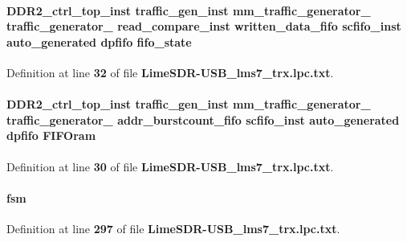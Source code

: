 \paragraph[{fifo\+\_\+state}]{ {\bf D\+D\+R2\+\_\+ctrl\+\_\+top\+\_\+inst} {\bf traffic\+\_\+gen\+\_\+inst} {\bf mm\+\_\+traffic\+\_\+generator\+\_} {\bf traffic\+\_\+generator\+\_} {\bf read\+\_\+compare\+\_\+inst} {\bf written\+\_\+data\+\_\+fifo} scfifo\+\_\+inst {\bf auto\+\_\+generated} {\bf dpfifo} fifo\+\_\+state}\label{LimeSDR-USB__lms7__trx_8lpc_8txt_a89cac4e93d8726ab378ee7a18be4097e}


Definition at line {\bf 32} of file {\bf Lime\+S\+D\+R-\/\+U\+S\+B\+\_\+lms7\+\_\+trx.\+lpc.\+txt}.

\paragraph[{F\+I\+F\+Oram}]{ {\bf D\+D\+R2\+\_\+ctrl\+\_\+top\+\_\+inst} {\bf traffic\+\_\+gen\+\_\+inst} {\bf mm\+\_\+traffic\+\_\+generator\+\_} {\bf traffic\+\_\+generator\+\_} {\bf addr\+\_\+burstcount\+\_\+fifo} scfifo\+\_\+inst {\bf auto\+\_\+generated} {\bf dpfifo} F\+I\+F\+Oram}\label{LimeSDR-USB__lms7__trx_8lpc_8txt_afef08d59458d28966696100e2eb7ed27}


Definition at line {\bf 30} of file {\bf Lime\+S\+D\+R-\/\+U\+S\+B\+\_\+lms7\+\_\+trx.\+lpc.\+txt}.

\paragraph[{fsm}]{ fsm}\label{LimeSDR-USB__lms7__trx_8lpc_8txt_a8ee1b691c7ee1ab71bb30e2dc6cdd2b5}


Definition at line {\bf 297} of file {\bf Lime\+S\+D\+R-\/\+U\+S\+B\+\_\+lms7\+\_\+trx.\+lpc.\+txt}.

